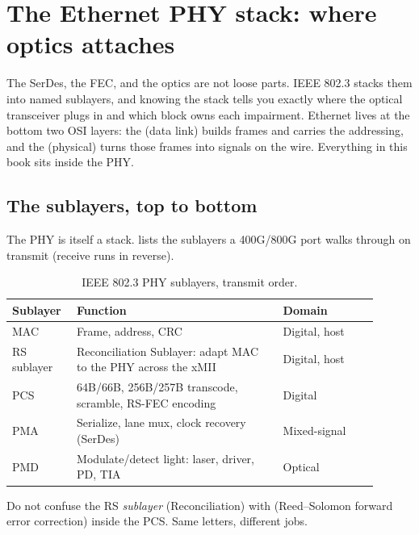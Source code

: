 \section{The Ethernet PHY stack: where optics attaches}
\label{sec:phy-stack}

The SerDes, the FEC, and the optics are not loose parts. IEEE 802.3 stacks them into
named sublayers, and knowing the stack tells you exactly where the optical
transceiver plugs in and which block owns each impairment. Ethernet lives at the
bottom two OSI layers: the  (data link) builds frames and carries the
addressing, and the  (physical) turns those frames into
signals on the wire. Everything in this book sits inside the PHY.

\subsection{The sublayers, top to bottom}

The PHY is itself a stack.  lists the sublayers a 400G/800G port
walks through on transmit (receive runs in reverse).

\begin{table}[ht]
\centering
\caption{IEEE 802.3 PHY sublayers, transmit order.\label{tab:phy-stack}}
\setlength{\tabcolsep}{4pt}%
\footnotesize
\renewcommand{\arraystretch}{1.25}%
\begin{tabular}{@{}p{0.14\linewidth}p{0.52\linewidth}p{0.24\linewidth}@{}}
\toprule
Sublayer & Function & Domain \\
\midrule
MAC & Frame, address, CRC & Digital, host \\
\addlinespace[1.5em]
RS sublayer & Reconciliation Sublayer: adapt MAC to the PHY across the xMII & Digital, host \\
\addlinespace[1.5em]
PCS & 64B/66B, 256B/257B transcode, scramble, RS-FEC encoding & Digital \\
\addlinespace[1.5em]
PMA & Serialize, lane mux, clock recovery (SerDes) & Mixed-signal \\
\addlinespace[1.5em]
PMD & Modulate/detect light: laser, driver, PD, TIA & Optical \\
\bottomrule
\end{tabular}
\end{table}

Do not confuse the RS \emph{sublayer} (Reconciliation) with 
(Reed--Solomon forward error correction) inside the PCS. Same letters, different
jobs.

